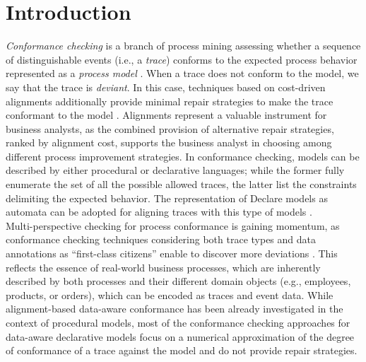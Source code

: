 \section{Introduction}
\label{sec:introduction}

\textit{Conformance checking} is a branch of process mining assessing whether a sequence of distinguishable events (i.e., a \textit{trace}) conforms to the expected process behavior represented as a \textit{process model} \cite{RozinatA08}. When a trace does not conform to the model, we say that the trace is \textit{deviant}. In this case, techniques based on cost-driven alignments additionally provide minimal repair strategies to make the trace conformant to the model \cite{DBLP:conf/edoc/AdriansyahDA11}. Alignments represent a valuable instrument for business analysts, as the combined provision of alternative repair strategies, ranked by alignment cost, supports the business analyst in choosing among different process improvement strategies. In conformance checking, models can be described by either procedural or declarative languages;  while the former fully enumerate the set of all the possible allowed traces, the latter %
list the constraints delimiting the expected behavior. %
%
The representation of Declare models as automata can be adopted for aligning traces with this type of models \cite{LeoniMA12,XuLZ17a}.
\\
\indent
Multi-perspective checking for process conformance is gaining momentum, as conformance checking techniques considering both trace types and data annotations as ``first-class citizens'' enable to discover more deviations \cite{MultiPerspective}. This reflects the essence of real-world business processes, which are inherently described by both processes and their different domain objects \cite{PetermannJMR14} (e.g., employees, products, or orders), which can be encoded as traces and event data. While alignment-based  data-aware conformance has been already investigated in the context of procedural models, most of the conformance checking approaches for data-aware declarative models \cite{BurattinMS16,Borrego014} focus on a numerical approximation of the degree of conformance of a trace against the model and do not provide repair strategies.
